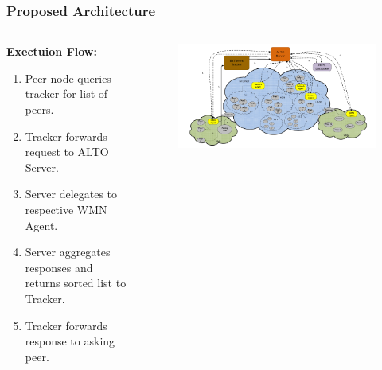 \documentclass[10pt,    %
    english,            %
    xcolor=table,       %
    envcountsect,        %
    aspectratio=169     %
]{beamer}
\begin{document}
\begin{frame}
    \frametitle{Proposed Architecture}

    \vspace{-15pt}
    \begin{columns}
        \begin{column}{.35\textwidth}
            \textbf{Exectuion Flow:}
            \begin{enumerate}
                \item Peer node queries tracker for list of peers.
                \item Tracker forwards request to ALTO Server.
                \item Server delegates to respective WMN Agent.
                \item Server aggregates responses and returns sorted list to Tracker.
                \item Tracker forwards response to asking peer.
            \end{enumerate}
        \end{column}
        \begin{column}{.70\textwidth}
            \begin{figure}[h!]
                \centering
                \includegraphics[width=1.05\textwidth]{./images/architecture.png}
            \end{figure}
        \end{column}
    \end{columns}

\end{frame}
\end{document}

